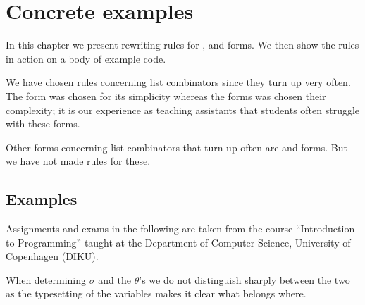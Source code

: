 \chapter{Concrete examples}
\label{chap:concrete-examples}
In this chapter we present rewriting rules for ,  and
 forms. We then show the rules in action on a body of example code.

We have chosen rules concerning list combinators since they turn up very
often. The  form was chosen for its simplicity whereas the
 forms was chosen their complexity; it is our experience as
teaching assistants that students often struggle with these forms.

Other forms concerning list combinators that turn up often are  and
 forms. But we have not made rules for these.



\section{Examples}
Assignments and exams in the following are taken from the course ``Introduction
to Programming'' taught at the Department of Computer Science, University of
Copenhagen (DIKU).

When determining $\sigma$ and the $\theta$'s we do not distinguish sharply
between the two as the typesetting of the variables makes it clear what belongs
where.





